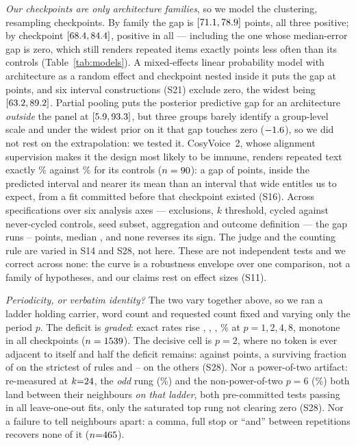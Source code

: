 \emph{Our \NModels{} checkpoints are only \NFamilies{} architecture families},
so we model the clustering, resampling checkpoints. By family the gap is
\FamExact{} $[71.1{},78.9{}]$ points, all three positive; by
checkpoint \CkExact{} $[68.4{},84.4{}]$, positive in all
\CkExactNPos{} --- including the one whose median-error gap is zero, which still
renders repeated items exactly \CkRevExact{} points less often than its controls
(Table~\ref{tab:models}). A mixed-effects linear probability model with
architecture as a random effect and checkpoint nested inside it puts the gap at
\MixArm{} points, and \MixAllClear{} six interval constructions (S21) exclude zero,
the widest being $[63.2{},89.2{}]$. Partial pooling puts the posterior
predictive gap for an architecture \emph{outside} the panel at \BayesNewFam{}
$[5.9{},93.3{}]$, but three groups barely identify a
group-level scale and under the widest prior on it that gap touches zero
($-1.6{}$), so we did not rest on the extrapolation: we tested it.
CosyVoice~2, whose alignment supervision makes it the design most likely to be
immune, renders repeated text exactly \CosyRep{}\% against \CosyCtl{}\% for its
controls ($n=90{}$): a gap of \CosyGap{} points, inside the predicted
interval and nearer its \BayesNewFam{} mean than an interval that wide entitles
us to expect, from a fit committed before that checkpoint existed (S16). Across \SpecN{} specifications
over six analysis axes --- exclusions, $k$ threshold, cycled against
never-cycled controls, seed subset, aggregation and outcome definition --- the
gap runs \SpecLo{}--\SpecHi{} points, median \SpecMed{}, and none reverses its
sign. The judge and the counting rule are varied in S14 and S28, not here. These are not independent tests and we correct across none: the curve is a
robustness envelope over one comparison, not a family of hypotheses, and our
claims rest on effect sizes (S11).

\emph{Periodicity, or verbatim identity?} The two vary together above, so we ran
a ladder holding carrier, word count and requested count fixed and varying only
the period $p$. The deficit is \emph{graded}: exact rates rise \PerPOne{},
\PerPTwo{}, \PerPFour{}, \PerPEight{}\% at $p=1,2,4,8$, monotone in all
\PerNCk{} checkpoints ($n=1539{}$). The decisive cell is $p\!=\!2$, where no token
is ever adjacent to itself and half the deficit remains: \PerDTwo{} against
\PerDOne{} points, a surviving fraction of \PerRatioScan{} on the
strictest of \PerNRules{} rules and \PerRatioRecLo{}--\PerRatioRecHi{} on the
others (S28). Nor a power-of-two artifact: re-measured at $k{=}24{}$,
the \emph{odd} rung (\OddPThree{}\%) and the non-power-of-two $p{=}6$
(\OddPSix{}\%) both land between their neighbours \emph{on that ladder}, both
pre-committed tests passing in all \OddLooPass{} leave-one-out fits, only the
saturated top rung not clearing zero (S28). Nor a failure to tell neighbours
apart: a comma, full stop or ``and'' between repetitions recovers none of it
($n{=}465{}$).

